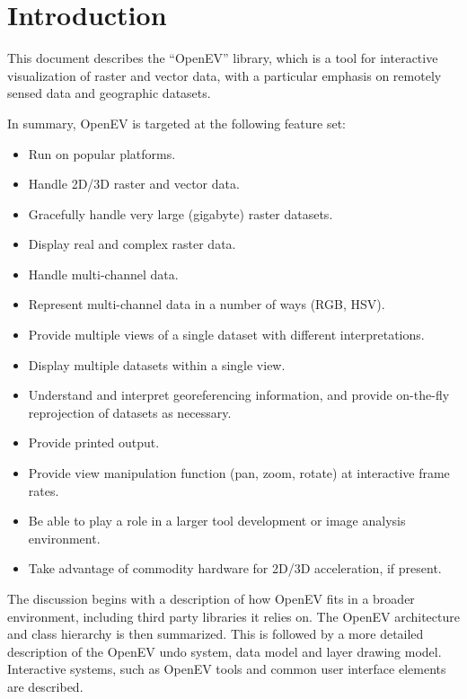 \documentclass{openevreport}
\begin{document}

\setlength{\parskip}{1.0ex}
\tableofcontents
\setlength{\parskip}{3.0ex}
\clearpage
{}
\setcounter{page}{1}

\chapter{Introduction}

This document describes the ``OpenEV'' library, which is a tool for
interactive visualization of raster and vector data, with a particular
emphasis on remotely sensed data and geographic datasets.

In summary, OpenEV is targeted at the following feature set:
\begin{itemize}
\item Run on popular platforms.
\item Handle 2D/3D raster and vector data.
\item Gracefully handle very large (gigabyte) raster datasets. 
\item Display real and complex raster data.
\item Handle multi-channel data.
\item Represent multi-channel data in a number of ways (RGB, HSV).
\item Provide multiple views of a single dataset with different
interpretations.
\item Display multiple datasets within a single view.
\item Understand and interpret georeferencing information, and provide 
on-the-fly reprojection of datasets as necessary.
\item Provide printed output.
\item Provide view manipulation function (pan, zoom, rotate) at
interactive frame rates.
\item Be able to play a role in a larger tool development or image
analysis environment.
\item Take advantage of commodity hardware for 2D/3D acceleration, if
present.
\end{itemize}

The discussion begins with a description of how OpenEV fits in a
broader environment, including third party
libraries it relies on.  The OpenEV architecture and class hierarchy is
then summarized.  This is followed by a more detailed description of
the OpenEV undo system, data model and layer drawing model.
Interactive systems, such as OpenEV tools and common user interface
elements are described.
\end{document}
